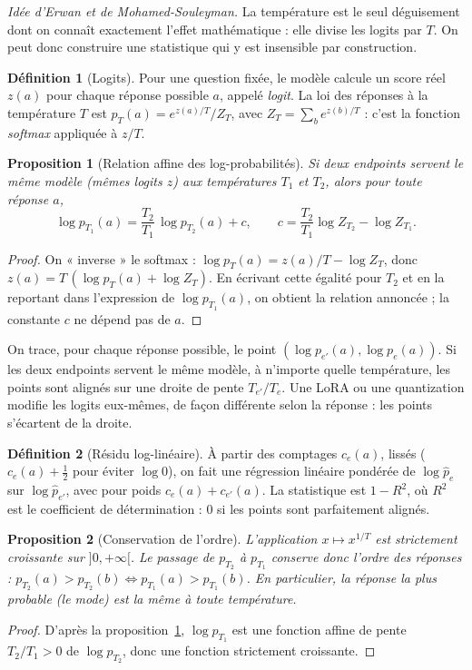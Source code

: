 \documentclass[11pt,a4paper]{report}
\theoremstyle{definition}
\newtheorem{definition}{Définition}[chapter]
\theoremstyle{plain}
\newtheorem{proposition}{Proposition}[chapter]
\begin{document}
\emph{Idée d'Erwan et de Mohamed-Souleyman.} La température est le seul déguisement dont on connaît exactement l'effet mathématique : elle divise les logits par $T$. On peut donc construire une statistique qui y est insensible par construction.

\begin{definition}[Logits]
Pour une question fixée, le modèle calcule un score réel $z(a)$ pour chaque réponse possible $a$, appelé \emph{logit}. La loi des réponses à la température $T$ est $p_T(a) = e^{z(a)/T} / Z_T$, avec $Z_T = \sum_b e^{z(b)/T}$ : c'est la fonction \emph{softmax} appliquée à $z/T$.
\end{definition}

\begin{proposition}[Relation affine des log-probabilités]\label{prop:loglin}
Si deux endpoints servent le même modèle (mêmes logits $z$) aux températures $T_1$ et $T_2$, alors pour toute réponse $a$,
\[
\log p_{T_1}(a) = \frac{T_2}{T_1}\,\log p_{T_2}(a) + c, \qquad c = \frac{T_2}{T_1}\log Z_{T_2} - \log Z_{T_1}.
\]
\end{proposition}
\begin{proof}
On « inverse » le softmax : $\log p_T(a) = z(a)/T - \log Z_T$, donc $z(a) = T\,(\log p_T(a) + \log Z_T)$. En écrivant cette égalité pour $T_2$ et en la reportant dans l'expression de $\log p_{T_1}(a)$, on obtient la relation annoncée ; la constante $c$ ne dépend pas de $a$.
\end{proof}

\begin{intuition}
On trace, pour chaque réponse possible, le point $(\log p_{e'}(a), \log p_e(a))$. Si les deux endpoints servent le même modèle, à n'importe quelle température, les points sont alignés sur une droite de pente $T_{e'}/T_e$. Une LoRA ou une quantization modifie les logits eux-mêmes, de façon différente selon la réponse : les points s'écartent de la droite.
\end{intuition}

\begin{definition}[Résidu log-linéaire]
À partir des comptages $c_e(a)$, lissés ($c_e(a)+\frac12$ pour éviter $\log 0$), on fait une régression linéaire pondérée de $\log\hat p_e$ sur $\log\hat p_{e'}$, avec pour poids $c_e(a)+c_{e'}(a)$. La statistique est $1-R^2$, où $R^2$ est le coefficient de détermination : 0 si les points sont parfaitement alignés.
\end{definition}

\begin{proposition}[Conservation de l'ordre]\label{prop:rang}
L'application $x\mapsto x^{1/T}$ est strictement croissante sur $]0,+\infty[$. Le passage de $p_{T_2}$ à $p_{T_1}$ conserve donc l'ordre des réponses : $p_{T_2}(a) > p_{T_2}(b) \iff p_{T_1}(a) > p_{T_1}(b)$. En particulier, la réponse la plus probable (le mode) est la même à toute température.
\end{proposition}
\begin{proof}
D'après la proposition~\ref{prop:loglin}, $\log p_{T_1}$ est une fonction affine de pente $T_2/T_1>0$ de $\log p_{T_2}$, donc une fonction strictement croissante.
\end{proof}
\end{document}
